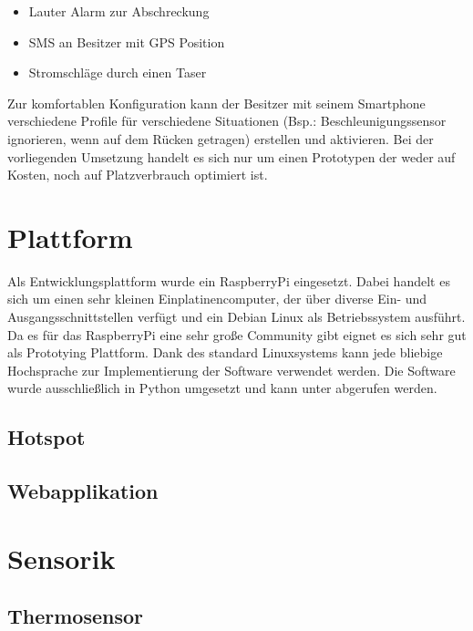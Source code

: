 \documentclass{sigchi}
\begin{document}
\begin{itemize} 
\item Lauter Alarm zur Abschreckung
\item SMS an Besitzer mit GPS Position
\item Stromschläge durch einen Taser
\end{itemize}

Zur komfortablen Konfiguration kann der Besitzer mit seinem
Smartphone verschiedene Profile für verschiedene Situationen 
(Bsp.: Beschleunigungssensor ignorieren, wenn auf dem Rücken getragen)
erstellen und aktivieren. Bei der vorliegenden Umsetzung handelt
es sich nur um einen Prototypen der weder auf Kosten, noch auf
Platzverbrauch optimiert ist.

\section{Plattform}
Als Entwicklungsplattform wurde ein RaspberryPi eingesetzt. Dabei
handelt es sich um einen sehr kleinen Einplatinencomputer, der
über diverse Ein- und Ausgangsschnittstellen verfügt und ein
Debian Linux als Betriebssystem ausführt. Da es für das RaspberryPi
eine sehr große Community gibt eignet es sich sehr gut als
Prototying Plattform. Dank des standard Linuxsystems kann 
jede bliebige Hochsprache zur Implementierung der Software
verwendet werden. Die Software wurde ausschließlich in Python
umgesetzt und kann unter \cite{Github:Software} abgerufen werden.

\subsection{Hotspot}

\subsection{Webapplikation}

\section{Sensorik}

\subsection{Thermosensor}
\end{document}
